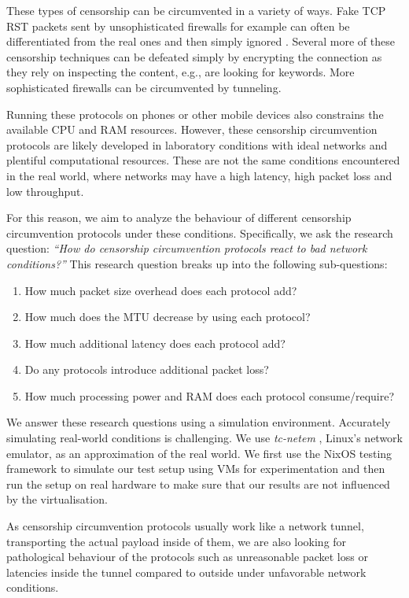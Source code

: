 These types of censorship can be circumvented in a variety of ways.
Fake TCP RST packets sent by unsophisticated firewalls for example can often be differentiated from the real ones and then simply ignored \cite{GoodbyeDPI-passive}.
Several more of these censorship techniques can be defeated simply by encrypting the connection as they rely on inspecting the content, e.g., are looking for keywords.
More sophisticated firewalls can be circumvented by tunneling.

Running these protocols on phones or other mobile devices also constrains the available CPU and RAM resources.
However, these censorship circumvention protocols are likely developed in laboratory conditions with ideal networks and plentiful computational resources.
These are not the same conditions encountered in the real world, where networks may have a high latency, high packet loss and low throughput.

For this reason, we aim to analyze the behaviour of different censorship circumvention protocols under these conditions.
Specifically, we ask the research question:
\emph{``How do censorship circumvention protocols react to bad network conditions?''}
This research question breaks up into the following sub-questions:
\begin{enumerate}
  \item How much packet size overhead does each protocol add?
  \item How much does the MTU decrease by using each protocol?
  \item How much additional latency does each protocol add?
  \item Do any protocols introduce additional packet loss?
  \item How much processing power and RAM does each protocol consume/require?
\end{enumerate}

We answer these research questions using a simulation environment.
Accurately simulating real-world conditions is challenging.
We use \textit{tc-netem} \cite{man8:tc-netem}, Linux's network emulator, as an approximation of the real world.
We first use the NixOS testing framework to simulate our test setup using VMs for experimentation and then run the setup on real hardware to make sure that our results are not influenced by the virtualisation.

As censorship circumvention protocols usually work like a network tunnel, transporting the actual payload inside of them, we are also looking for pathological behaviour of the protocols such as unreasonable packet loss or latencies inside the tunnel compared to outside under unfavorable network conditions.

